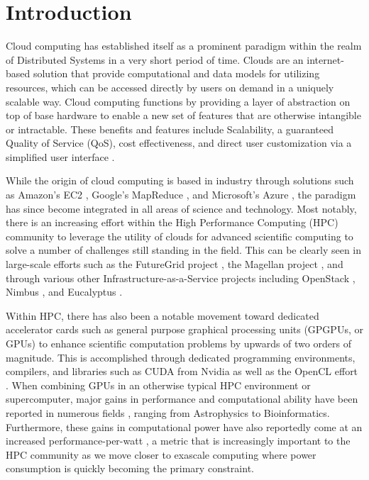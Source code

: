 
\section{Introduction}


Cloud computing \cite{aboveTheClouds} has established itself as a prominent paradigm within the realm of Distributed Systems \cite{tanenbaum2002distributed} in a very short period of time. Clouds are an internet-based solution that provide computational and data models for utilizing resources, which can be accessed directly by users on demand in a uniquely scalable way. Cloud computing functions by providing a layer of abstraction on top of base hardware to enable a new set of features that are otherwise intangible or intractable. These benefits and features include Scalability, a guaranteed Quality of Service (QoS), cost effectiveness, and direct user customization via a simplified user interface \cite{wang2010ngc}.



While the origin of cloud computing is based in industry through solutions such as Amazon's EC2 \cite{www-amazon-ec2}, Google's MapReduce \cite{DBLP:journals/cacm/DeanG08}, and Microsoft's Azure \cite{Azure}, the paradigm has since become integrated in all areas of science and technology.  Most notably, there is an increasing effort within the High Performance Computing (HPC) community to leverage the utility of clouds for advanced scientific computing to solve a number of challenges still standing in the field. This can be clearly seen in large-scale efforts such as the FutureGrid project \cite{FG2010design}, the  Magellan project \cite{MagellanFinal}, and through various other Infrastructure-as-a-Service projects including OpenStack \cite{openstack2013},  Nimbus \cite{virtualwork}, and Eucalyptus \cite{EucalyptusPaper}.  


Within HPC, there has also been a notable movement toward dedicated accelerator cards such as general purpose graphical processing units (GPGPUs, or GPUs) to enhance scientific computation problems by upwards of two orders of magnitude. This is accomplished through dedicated programming environments, compilers, and libraries such as CUDA \cite{nvidia2008programming} from Nvidia as well as the OpenCL effort \cite{stone2010opencl}.  When combining GPUs in an otherwise typical HPC environment or supercomputer, major gains in performance and computational ability have been reported in numerous fields \cite{Che2008cuda, Liu08kmeansgpu}, ranging from Astrophysics to Bioinformatics. Furthermore, these gains in computational power have also reportedly come at an increased performance-per-watt \cite{hong2010integrated}, a metric that is increasingly important to the HPC community as we move closer to exascale computing \cite{kogge2008exascale} where power consumption is quickly becoming the primary constraint.


